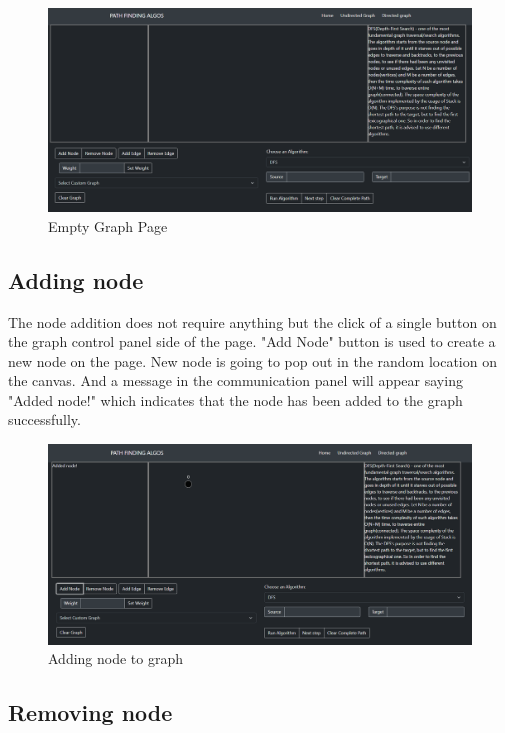 \begin{figure}[H]
	\centering
	\includegraphics[width=\textwidth]{images/empty_graph_page.png}
	\caption{Empty Graph Page}
\end{figure}

\subsection{Adding node}

The node addition does not require anything but the click of a single button on the graph control panel side of the page. "Add Node" button is used to create a new node on the page. New node is going to pop out in the random location on the canvas. And a message in the communication panel will appear saying "Added node!" which indicates that the node has been added to the graph successfully.

\begin{figure}[H]
	\centering
	\includegraphics[width=\textwidth]{images/add_node_to_graph.png}
	\caption{Adding node to graph}
\end{figure}

\subsection{Removing node}

